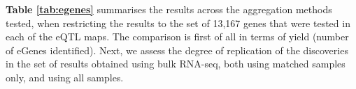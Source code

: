 
\textbf{Table \ref{tab:egenes}} summarises the results across the aggregation methods tested, when restricting the results to the set of 13,167 genes that were tested in each of the eQTL maps.
The comparison is first of all in terms of yield (number of eGenes identified).
Next, we assess the degree of replication of the discoveries in the set of results obtained using bulk RNA-seq, both using matched samples only, and using all samples.\\






